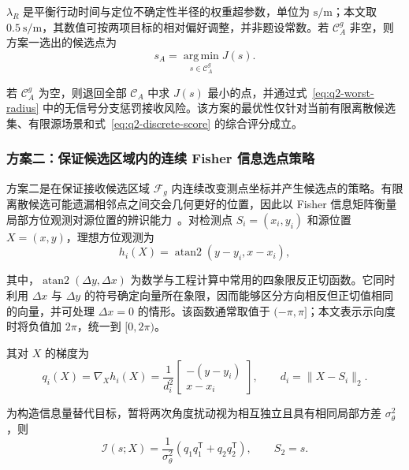 \documentclass[withoutpreface,bwprint]{cumcmthesis}
\begin{document}
$\lambda_R$ 是平衡行动时间与定位不确定性半径的权重超参数，单位为 $\mathrm{s/m}$；本文取 $0.5\ \mathrm{s/m}$，其数值可按两项目标的相对偏好调整，并非题设常数。若 $\mathcal C_A^g$ 非空，则方案一选出的候选点为
\begin{equation}
  s_A=\operatorname*{arg\,min}_{s\in
  \mathcal C_A^g}J(s).
  \label{eq:q2-baseline-choice}
\end{equation}

若 $\mathcal C_A^g$ 为空，则退回全部 $\mathcal C_A$ 中求 $J(s)$ 最小的点，并通过式~\eqref{eq:q2-worst-radius} 中的无信号分支惩罚接收风险。该方案的最优性仅针对当前有限离散候选集、有限源场景和式~\eqref{eq:q2-discrete-score} 的综合评分成立。

\subsubsection{方案二：保证候选区域内的连续 Fisher 信息选点策略}

方案二是在保证接收候选区域 $\widehat{\mathcal F}_g$ 内连续改变测点坐标并产生候选点的策略。有限离散候选可能遗漏相邻点之间交会几何更好的位置，因此以 Fisher 信息矩阵衡量局部方位观测对源位置的辨识能力~\cite{fisher1922}。对检测点 $S_i=(x_i,y_i)$ 和源位置 $X=(x,y)$，理想方位观测为
\begin{equation}
  h_i(X)=\operatorname{atan2}(y-y_i,x-x_i),
\end{equation}

其中，$\operatorname{atan2}(\Delta y,\Delta x)$ 为数学与工程计算中常用的四象限反正切函数。它同时利用 $\Delta x$ 与 $\Delta y$ 的符号确定向量所在象限，因而能够区分方向相反但正切值相同的向量，并可处理 $\Delta x=0$ 的情形。该函数通常取值于 $(-\pi,\pi]$；本文表示示向度时将负值加 $2\pi$，统一到 $[0,2\pi)$。

其对 $X$ 的梯度为
\begin{equation}
  q_i(X)=\nabla_X h_i(X)
  =\frac{1}{d_i^2}
  \begin{bmatrix}
    -(y-y_i)\\ x-x_i
  \end{bmatrix},
  \qquad d_i=\|X-S_i\|_2.
\end{equation}

为构造信息量替代目标，暂将两次角度扰动视为相互独立且具有相同局部方差 $\sigma_\theta^2$，则
\begin{equation}
  \mathcal I(s;X)
  =\frac{1}{\sigma_\theta^2}
  \left(q_1q_1^{\mathsf T}+q_2q_2^{\mathsf T}\right),
  \qquad S_2=s.
  \label{eq:q2-fim}
\end{equation}
\end{document}
